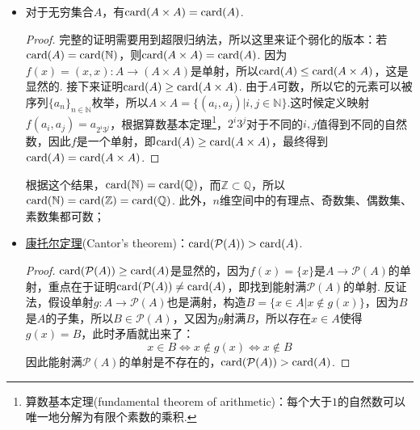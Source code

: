 \begin{itemize}
    \item [(1)] 对于无穷集合\(A\)，有\({\rm card}(A \times A) = {\rm card}(A)\).
    \begin{proof}
        完整的证明需要用到超限归纳法，所以这里来证个弱化的版本：若\({\rm card}(A)={\rm card}(\mathbb{N})\)，则\({\rm card}(A \times A) = {\rm card}(A)\).
        \newline
        因为\(f(x) = (x,x): A \to (A \times A)\)是单射，所以\({\rm card}(A) \leq {\rm card}(A \times A)\)，这是显然的. 接下来证明\({\rm card}(A) \geq {\rm card}(A \times A)\). 由于\(A\)可数，所以它的元素可以被序列\(\{a_n\}_{n \in \mathbb{N}}\)枚举，所以\(A \times A = \{(a_i, a_j)|i,j \in \mathbb{N}\}\).这时候定义映射\(f(a_i,a_j) = a_{2^i 3^j}\)，根据算数基本定理\footnote{算数基本定理(fundamental theorem of arithmetic)：每个大于\(1\)的自然数可以唯一地分解为有限个素数的乘积.}，\(2^i3^j\)对于不同的\(i,j\)值得到不同的自然数，因此\(f\)是一个单射，即\({\rm card}(A) \geq {\rm card}(A \times A)\)，最终得到\({\rm card}(A) = {\rm card}(A \times A)\).
    \end{proof}

    根据这个结果，\({\rm card}(\mathbb{N})={\rm card}(\mathbb{Q})\)，而\(\mathbb{Z} \subset \mathbb{Q}\)，所以\({\rm card}(\mathbb{N})={\rm card}(\mathbb{Z})={\rm card}(\mathbb{Q})\). 此外，\(n\)维空间中的有理点、奇数集、偶数集、素数集都可数；

    \item [(2)] \underline{康托尔定理}(Cantor's theorem)：\({\rm card}(\mathcal{P}(A)) > {\rm card}(A)\).
    \begin{proof}
        \({\rm card}(\mathcal{P}(A)) \geq {\rm card}(A)\)是显然的，因为\(f(x)=\{x\}\)是\(A \to \mathcal{P}(A)\)的单射，重点在于证明\({\rm card}(\mathcal{P}(A)) \neq {\rm card}(A)\)，即找到能射满\(\mathcal{P}(A)\)的单射. 反证法，假设单射\(g:A \to \mathcal{P}(A)\)也是满射，构造\(B=\{x \in A | x \not \in g(x)\}\)，因为\(B\)是\(A\)的子集，所以\(B \in \mathcal{P}(A)\)，又因为\(g\)射满\(B\)，所以存在\(x \in A\)使得\(g(x)=B\)，此时矛盾就出来了：
        \[x \in B \Longleftrightarrow x \not \in g(x) \Longleftrightarrow x \not \in B\]
        因此能射满\(\mathcal{P}(A)\)的单射是不存在的，\({\rm card}(\mathcal{P}(A)) > {\rm card}(A)\).
    \end{proof}


\end{itemize}

